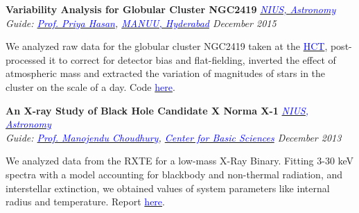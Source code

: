 \documentclass[margin,line]{res}
\newenvironment{list1}{
  \begin{list}{\ding{113}}{%
      \setlength{\itemsep}{0in}
      \setlength{\parsep}{0in} \setlength{\parskip}{0in}
      \setlength{\topsep}{0in} \setlength{\partopsep}{0in} 
      \setlength{\leftmargin}{0.17in}}}{\end{list}}
\begin{document}
\begin{resume}
\vspace*{-0.1in}

{\bf Variability Analysis for Globular Cluster NGC2419} \hfill \textit{\href{http://nius.hbcse.tifr.res.in/}{\textcolor{blue} {NIUS, Astronomy}}} \\
{\em Guide: \href{http://http://manuu.ac.in/deptphysc_faclty.php/}{\textcolor{blue}{Prof. Priya Hasan}}, \href{http://manuu.ac.in/}{\textcolor{blue} {MANUU, Hyderabad}} \hfill December 2015} \\
\vspace*{-.15in}
\begin{list1}
\item[] We analyzed raw data for the globular cluster NGC2419 taken at the \href{http://www.iiap.res.in/iao/cycle.html}{\textcolor{blue} {HCT}}, post-processed it to correct for detector bias and flat-fielding, inverted the effect of atmospheric mass and extracted the variation of magnitudes of stars in the cluster on the scale of a day. Code \href{https://github.com/alankarkotwal/ngc2419-variables}{\textcolor{blue} {here}}.
\end{list1}

\vspace*{-0.1in}

{\bf An X-ray Study of Black Hole Candidate X Norma X-1} \hfill \textit{\href{http://nius.hbcse.tifr.res.in/}{\textcolor{blue} {NIUS, Astronomy}}} \\
{\em Guide: \href{http://cbs.ac.in/people/visiting-scientists/manojendu-choudhury}{\textcolor{blue}{Prof. Manojendu Choudhury}}, \href{http://cbs.ac.in/}{\textcolor{blue} {Center for Basic Sciences}} \hfill December 2013} \\
\vspace*{-.15in}
\begin{list1}
\item[] We analyzed data from the RXTE for a low-mass X-Ray Binary. Fitting 3-30 keV spectra with a model accounting for blackbody and non-thermal radiation, and interstellar extinction, we obtained values of system parameters like internal radius and temperature. Report \href{https://alankarkotwal.github.io/4U_1630-47_Report.pdf}{\textcolor{blue} {here}}.
\end{list1}

\vspace*{-0.1in}


\end{resume}
\end{document}
